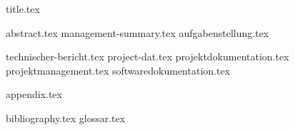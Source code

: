 \documentclass{scrbook}
\begin{document}
	\frontmatter
		{title.tex} 
		\cleardoublepage


		{abstract.tex}
		{management-summary.tex}
		{aufgabenstellung.tex}

		\clearpage
		\tableofcontents

		\clearpage
		\listoffigures
		

		\listoftables
		

		



	\mainmatter
		{technischer-bericht.tex}
		{project-dat.tex}
		{projektdokumentation.tex}
		{projektmanagement.tex}
		{softwaredokumentation.tex}
	
		\cleardoublepage
		\appendix
		{appendix.tex}
		
	\backmatter
		{bibliography.tex}
		{glossar.tex}
	
\end{document}
